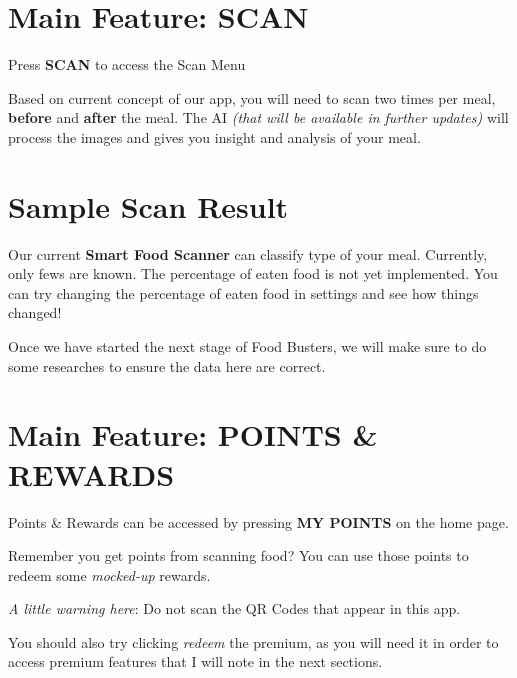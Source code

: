 \documentclass[a4paper,12pt]{article}
\begin{document}
\pagebreak
\section{Main Feature: SCAN}

Press \textbf{SCAN} to access the Scan Menu


Based on current concept of our app, you will need to scan two times per meal,
\textbf{before} and \textbf{after} the meal.
The AI \textit{(that will be available in further updates)} will process
the images and gives you insight and analysis of your meal.

\pagebreak
\section*{Sample Scan Result}


Our current \textbf{Smart Food Scanner} can classify type of your meal.
Currently, only fews are known. The percentage of eaten food is not yet implemented.
You can try changing the percentage of eaten food in settings and see how things changed!

Once we have started the next stage of Food Busters, we will make sure to do
some researches to ensure the data here are correct.

\pagebreak
\section{Main Feature: POINTS \& REWARDS}

Points \& Rewards can be accessed by pressing \textbf{MY POINTS} on the home page.


Remember you get points from scanning food? You can use those points to redeem
some \textit{mocked-up} rewards.

\textit{A little warning here}: Do not scan the QR Codes that appear in this app.

You should also try clicking \textit{redeem} the premium, as you will need it
in order to access premium features that I will note in the next sections.
\end{document}
